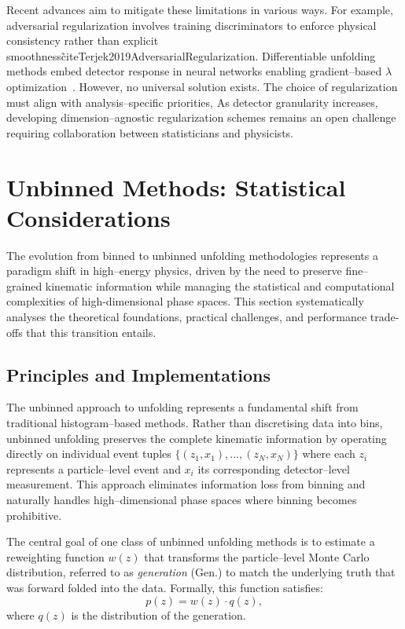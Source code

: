         Recent advances aim to mitigate these limitations in various ways.
        For example, adversarial regularization involves training discriminators to enforce physical consistency rather than explicit smoothness\~cite{Terjek2019AdversarialRegularization}.
        Differentiable unfolding methods embed detector response in neural networks enabling gradient--based \(\lambda\) optimization~\cite{delaRosa2020DifferentiableAnalysis}.
        However, no universal solution exists.
        The choice of regularization must align with analysis--specific priorities,
        As detector granularity increases, developing dimension--agnostic regularization schemes remains an open challenge requiring collaboration between statisticians and physicists.
\section{Unbinned Methods: Statistical Considerations}  
    The evolution from binned to unbinned unfolding methodologies represents a paradigm shift in high--energy physics, driven by the need to preserve fine--grained kinematic information while managing the statistical and computational complexities of high-dimensional phase spaces.
    This section systematically analyses the theoretical foundations, practical challenges, and performance trade-offs that this transition entails.
    \subsection{Principles and Implementations}
        The unbinned approach to unfolding represents a fundamental shift from traditional histogram--based methods.
        Rather than discretising data into bins, unbinned unfolding preserves the complete kinematic information by operating directly on individual event tuples \(\{(z_1, x_1), ..., (z_N, x_N)\}\) where each \(z_i\) represents a particle--level event and \(x_i\) its corresponding detector--level measurement.
        This approach eliminates information loss from binning and naturally handles high--dimensional phase spaces where binning becomes prohibitive.

        The central goal of one class of unbinned unfolding methods is to estimate a reweighting function \(w(z)\) that transforms the particle--level Monte Carlo distribution, referred to as \emph{generation} (Gen.) to match the underlying truth that was forward folded into the data.
        Formally, this function satisfies:
        \begin{equation}
            p(z) = w(z) \cdot q(z),
        \end{equation}
        where \(q(z)\) is the distribution of the generation.

